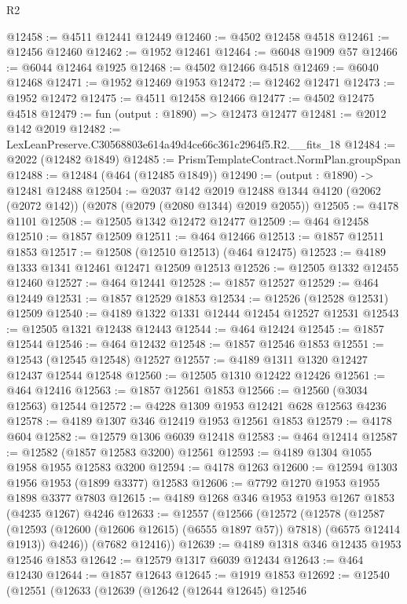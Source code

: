 \begin{lexlean}{R2}
\begin{coremodule}
@12458 := @4511 @12441 @12449
@12460 := @4502 @12458 @4518
@12461 := @12456 @12460
@12462 := @1952 @12461
@12464 := @6048 @1909 @57
@12466 := @6044 @12464 @1925
@12468 := @4502 @12466 @4518
@12469 := @6040 @12468
@12471 := @1952 @12469 @1953
@12472 := @12462 @12471
@12473 := @1952 @12472
@12475 := @4511 @12458 @12466
@12477 := @4502 @12475 @4518
@12479 := fun (output : @1890) => @12473 @12477
@12481 := @2012 @142 @2019
@12482 := LexLeanPreserve.C30568803e614a49d4ce66c361c2964f5.R2.__fits_18
@12484 := @2022 (@12482 @1849)
@12485 := PrismTemplateContract.NormPlan.groupSpan
@12488 := @12484 (@464 (@12485 @1849))
@12490 := (output : @1890) -> @12481 @12488
@12504 := @2037
    @142
    @2019
    @12488
    @1344
    @4120
    (@2062 (@2072 @142))
    (@2078 (@2079 (@2080 @1344) @2019 @2055))
@12505 := @4178 @1101
@12508 := @12505 @1342 @12472 @12477
@12509 := @464 @12458
@12510 := @1857 @12509
@12511 := @464 @12466
@12513 := @1857 @12511 @1853
@12517 := @12508 (@12510 @12513) (@464 @12475)
@12523 := @4189 @1333 @1341 @12461 @12471 @12509 @12513
@12526 := @12505 @1332 @12455 @12460
@12527 := @464 @12441
@12528 := @1857 @12527
@12529 := @464 @12449
@12531 := @1857 @12529 @1853
@12534 := @12526 (@12528 @12531) @12509
@12540 := @4189 @1322 @1331 @12444 @12454 @12527 @12531
@12543 := @12505 @1321 @12438 @12443
@12544 := @464 @12424
@12545 := @1857 @12544
@12546 := @464 @12432
@12548 := @1857 @12546 @1853
@12551 := @12543 (@12545 @12548) @12527
@12557 := @4189 @1311 @1320 @12427 @12437 @12544 @12548
@12560 := @12505 @1310 @12422 @12426
@12561 := @464 @12416
@12563 := @1857 @12561 @1853
@12566 := @12560 (@3034 @12563) @12544
@12572 := @4228 @1309 @1953 @12421 @628 @12563 @4236
@12578 := @4189 @1307 @346 @12419 @1953 @12561 @1853
@12579 := @4178 @604
@12582 := @12579 @1306 @6039 @12418
@12583 := @464 @12414
@12587 := @12582 (@1857 @12583 @3200) @12561
@12593 := @4189 @1304 @1055 @1958 @1955 @12583 @3200
@12594 := @4178 @1263
@12600 := @12594 @1303 @1956 @1953 (@1899 @3377) @12583
@12606 := @7792 @1270 @1953 @1955 @1898 @3377 @7803
@12615 := @4189 @1268 @346 @1953 @1953 @1267 @1853 (@4235 @1267) @4246
@12633 := @12557
    (@12566
      (@12572
        (@12578
          (@12587 (@12593 (@12600 (@12606 @12615) (@6555 @1897 @57)) @7818) (@6575 @12414 @1913))
          @4246))
      (@7682 @12416))
@12639 := @4189 @1318 @346 @12435 @1953 @12546 @1853
@12642 := @12579 @1317 @6039 @12434
@12643 := @464 @12430
@12644 := @1857 @12643
@12645 := @1919 @1853
@12692 := @12540
    (@12551
      (@12633
        (@12639
          (@12642
            (@12644 @12645)
            @12546

\end{coremodule}
\end{lexlean}
